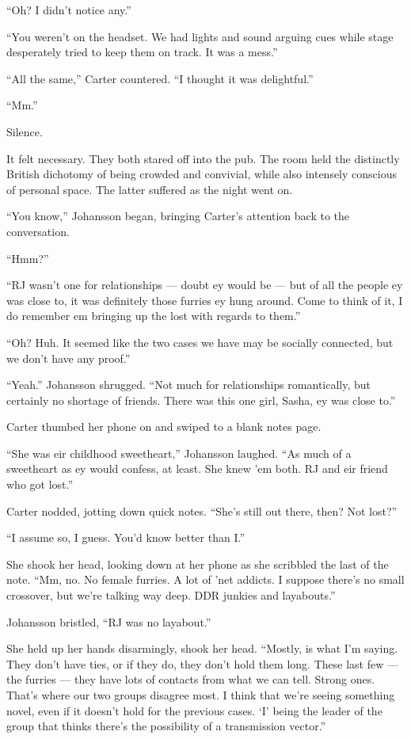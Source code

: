 ``Oh? I didn't notice any.''

``You weren't on the headset. We had lights and sound arguing cues while stage desperately tried to keep them on track. It was a mess.''

``All the same,'' Carter countered. ``I thought it was delightful.''

``Mm.''

Silence.

It felt necessary. They both stared off into the pub. The room held the distinctly British dichotomy of being crowded and convivial, while also intensely conscious of personal space. The latter suffered as the night went on.

``You know,'' Johansson began, bringing Carter's attention back to the conversation.

``Hmm?''

``RJ wasn't one for relationships — doubt ey would be — but of all the people ey was close to, it was definitely those furries ey hung around. Come to think of it, I do remember em bringing up the lost with regards to them.''

``Oh? Huh. It seemed like the two cases we have may be socially connected, but we don't have any proof.''

``Yeah.'' Johansson shrugged. ``Not much for relationships romantically, but certainly no shortage of friends. There was this one girl, Sasha, ey was close to.''

Carter thumbed her phone on and swiped to a blank notes page.

``She was eir childhood sweetheart,'' Johansson laughed. ``As much of a sweetheart as ey would confess, at least. She knew 'em both. RJ and eir friend who got lost.''

Carter nodded, jotting down quick notes. ``She's still out there, then? Not lost?''

``I assume so, I guess. You'd know better than I.''

She shook her head, looking down at her phone as she scribbled the last of the note. ``Mm, no. No female furries. A lot of 'net addicts. I suppose there's no small crossover, but we're talking way deep. DDR junkies and layabouts.''

Johansson bristled, ``RJ was no layabout.''

She held up her hands disarmingly, shook her head. ``Mostly, is what I'm saying. They don't have ties, or if they do, they don't hold them long. These last few — the furries — they have lots of contacts from what we can tell. Strong ones. That's where our two groups disagree most. I think that we're seeing something novel, even if it doesn't hold for the previous cases. `I' being the leader of the group that thinks there's the possibility of a transmission vector.''

